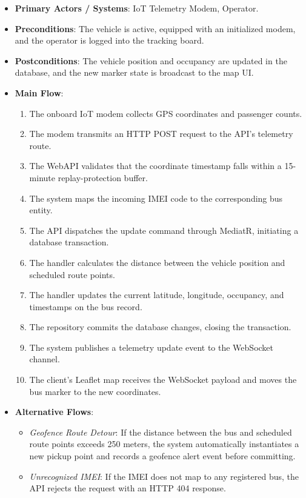 \begin{itemize}
  \item \textbf{Primary Actors / Systems}: IoT Telemetry Modem, Operator.
  \item \textbf{Preconditions}: The vehicle is active, equipped with an initialized modem, and the operator is logged into the tracking board.
  \item \textbf{Postconditions}: The vehicle position and occupancy are updated in the database, and the new marker state is broadcast to the map UI.
  \item \textbf{Main Flow}:
  \begin{enumerate}
    \item The onboard IoT modem collects GPS coordinates and passenger counts.
    \item The modem transmits an HTTP POST request to the API's telemetry route.
    \item The WebAPI validates that the coordinate timestamp falls within a 15-minute replay-protection buffer.
    \item The system maps the incoming IMEI code to the corresponding bus entity.
    \item The API dispatches the update command through MediatR, initiating a database transaction.
    \item The handler calculates the distance between the vehicle position and scheduled route points.
    \item The handler updates the current latitude, longitude, occupancy, and timestamps on the bus record.
    \item The repository commits the database changes, closing the transaction.
    \item The system publishes a telemetry update event to the WebSocket channel.
    \item The client's Leaflet map receives the WebSocket payload and moves the bus marker to the new coordinates.
  \end{enumerate}
  \item \textbf{Alternative Flows}:
  \begin{itemize}
    \item \emph{Geofence Route Detour}: If the distance between the bus and scheduled route points exceeds 250 meters, the system automatically instantiates a new pickup point and records a geofence alert event before committing.
    \item \emph{Unrecognized IMEI}: If the IMEI does not map to any registered bus, the API rejects the request with an HTTP 404 response.
  \end{itemize}
\end{itemize}

